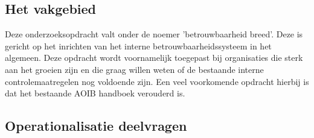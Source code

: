 \subsection{Het vakgebied}
Deze onderzoeksopdracht valt onder de noemer 'betrouwbaarheid breed'. Deze is gericht op het inrichten van het interne betrouwbaarheidssysteem in het algemeen. Deze opdracht wordt voornamelijk toegepast bij organisaties die sterk aan het groeien zijn en die graag willen weten of de bestaande interne controlemaatregelen nog voldoende zijn. Een veel voorkomende opdracht hierbij is dat het bestaande AOIB handboek verouderd is. \citep{bivpraktijk}


\newpage
\subsection{Operationalisatie deelvragen}

